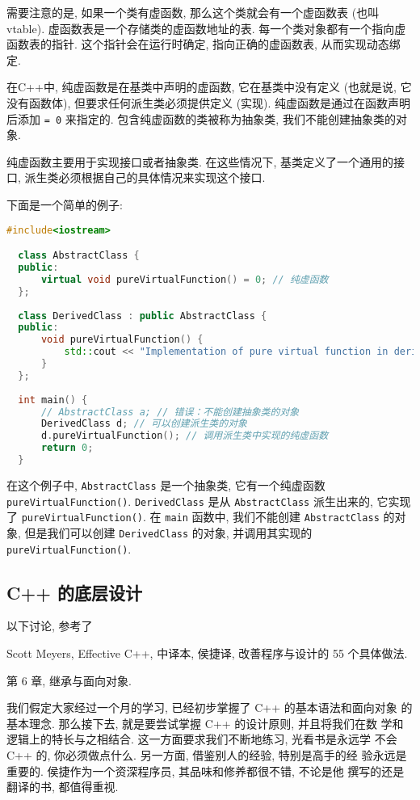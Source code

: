 \documentclass[a4paper]{ctexart}
\theoremstyle{definition}
\theoremstyle{definition}
\begin{document}
需要注意的是, 如果一个类有虚函数, 那么这个类就会有一个虚函数表 (也叫 vtable). 
虚函数表是一个存储类的虚函数地址的表. 每一个类对象都有一个指向虚函数表的指针. 这个指针会在运行时确定, 
指向正确的虚函数表, 从而实现动态绑定. 

在C++中, 纯虚函数是在基类中声明的虚函数, 它在基类中没有定义 (也就是说, 它没有函数体), 
但要求任何派生类必须提供定义 (实现). 纯虚函数是通过在函数声明后添加 \verb|= 0| 来指定的. 
包含纯虚函数的类被称为抽象类, 我们不能创建抽象类的对象.

纯虚函数主要用于实现接口或者抽象类. 在这些情况下, 基类定义了一个通用的接口, 派生类必须根据自己的具体情况来实现这个接口.

下面是一个简单的例子:

\begin{lstlisting}[language=c++]
  #include<iostream>

  class AbstractClass {
  public:
      virtual void pureVirtualFunction() = 0; // 纯虚函数
  };
  
  class DerivedClass : public AbstractClass {
  public:
      void pureVirtualFunction() {
          std::cout << "Implementation of pure virtual function in derived class." << std::endl;
      }
  };
  
  int main() {
      // AbstractClass a; // 错误：不能创建抽象类的对象
      DerivedClass d; // 可以创建派生类的对象
      d.pureVirtualFunction(); // 调用派生类中实现的纯虚函数
      return 0;
  }    
\end{lstlisting}

在这个例子中, \verb|AbstractClass| 是一个抽象类, 它有一个纯虚函数 \verb|pureVirtualFunction()|.
\verb|DerivedClass| 是从 \verb|AbstractClass| 派生出来的, 
它实现了 \verb|pureVirtualFunction()|. 在 \verb|main| 函数中, 
我们不能创建 \verb|AbstractClass| 的对象, 但是我们可以创建 \verb|DerivedClass| 的对象, 
并调用其实现的 \verb|pureVirtualFunction()|.

\subsection{C++ 的底层设计}

以下讨论, 参考了

Scott Meyers, Effective C++, 中译本, 侯捷译, 改善程序与设计的 55 个具体做法.

第 6 章, 继承与面向对象.

我们假定大家经过一个月的学习, 已经初步掌握了 C++ 的基本语法和面向对象
的基本理念. 那么接下去, 就是要尝试掌握 C++ 的设计原则, 并且将我们在数
学和逻辑上的特长与之相结合. 这一方面要求我们不断地练习, 光看书是永远学
不会 C++ 的, 你必须做点什么. 另一方面, 借鉴别人的经验, 特别是高手的经
验永远是重要的. 侯捷作为一个资深程序员, 其品味和修养都很不错, 不论是他
撰写的还是翻译的书, 都值得重视.
\end{document}
